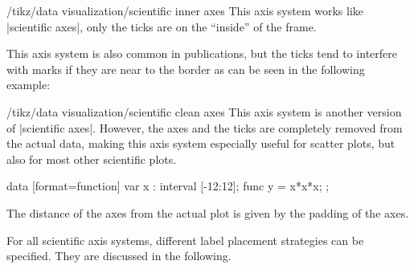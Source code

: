 \begin{key}{/tikz/data visualization/scientific inner axes}
  This axis system works like |scientific axes|, only the ticks are on
  the ``inside'' of the frame.

\begin{codeexample}[width=7cm]
\end{codeexample}

  This axis system is also common in publications, but the ticks tend
  to interfere with marks if they are near to the border as can be
  seen in the following example:
\begin{codeexample}[]
\end{codeexample}

\end{key}

\begin{key}{/tikz/data visualization/scientific clean axes}
  This axis system is another version of |scientific axes|. However, the
  axes and the ticks are completely removed from the actual data,
  making this axis system especially useful for scatter plots, but
  also for most other scientific plots.

\begin{codeexample}[width=7.5cm]
\tikz {}
data [format=function] {
  var x : interval [-12:12];
  func y = \value x*\value x*\value x;
};
\end{codeexample}

  The distance of the axes from the actual plot is given by the
  padding of the axes.
\end{key}


For all scientific axis systems, different label placement strategies
can be specified. They are discussed in the following.


